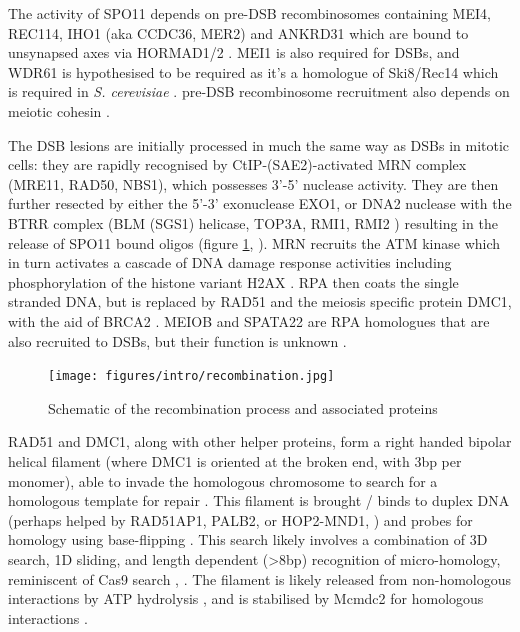 The activity of SPO11 depends on pre-DSB recombinosomes containing MEI4, REC114, IHO1 (aka CCDC36, MER2) and ANKRD31 which are bound to unsynapsed axes via HORMAD1/2 \parencite{Kumar2010Functional,Panizza2011Spo11Accessory, Stanzione2016Meiotic, Kumar2018Mouse, Papanikos2019Mouse, Boekhout2019REC114}. MEI1 is also required for DSBs, and WDR61 is hypothesised to be required as it's a homologue of Ski8/Rec14 which is required in \textit{S. cerevisiae} \parencite[reviewed in][]{Kumar2010Initiation, Lam2015Mechanism}. pre-DSB recombinosome recruitment also depends on meiotic cohesin \parencite{Bhattacharyya2019Prdm9}.

The DSB lesions are initially processed in much the same way as DSBs in mitotic cells: they are rapidly recognised by CtIP-(SAE2)-activated MRN complex (MRE11, RAD50, NBS1), which possesses 3'-5' nuclease activity. They are then further resected by either the 5'-3' exonuclease EXO1, or DNA2 nuclease with the BTRR complex (BLM (SGS1) helicase, TOP3A, RMI1, RMI2 \parencite{Daley2014Multifaceted}) resulting in the release of SPO11 bound oligos (figure \ref{fig:molecular_recombination}, \cite[Reviewed in][]{Symington2014End, Schiller2014Structural, Lam2015Mechanism}). MRN recruits the ATM kinase which in turn activates a cascade of DNA damage response activities including phosphorylation of the histone variant H2AX \parencite{Marechal2013DNA}. RPA then coats the single stranded DNA, but is replaced by RAD51 and the meiosis specific protein DMC1, with the aid of BRCA2 \parencite{Liu2010Human, Jensen2010Purified, Shi2019Dual}. MEIOB and SPATA22 are RPA homologues that are also recruited to DSBs, but their function is unknown \parencite{Xu2017Meiosisspecific}.


\begin{figure}[H]
	\centering
	\texttt{[image: figures/intro/recombination.jpg]}
	\caption[Molecular Recombination]{Schematic of the recombination process and associated proteins}
	\label{fig:molecular_recombination}
\end{figure}

RAD51 and DMC1, along with other helper proteins, form a right handed bipolar helical filament (where DMC1 is oriented at the broken end, with 3bp per monomer), able to invade the homologous chromosome to search for a homologous template for repair \parencite{Sehorn2004Human, Cloud2012Rad51, Brown2015Small, Brown2015DNA, Crickard2018Spontaneous}. This filament is brought / binds to duplex DNA (perhaps helped by RAD51AP1, PALB2, or HOP2-MND1, \cite{Petukhova2005Hop2}) and probes for homology using base-flipping \parencite{Gupta1999Rapid, Folta-Stogniew2004Exchange}. This search likely involves a combination of 3D search, 1D sliding, and length dependent (>8bp) recognition of micro-homology, reminiscent of Cas9 search \parencite{Ragunathan2012RecA,Forget2012Singlemolecule,Renkawitz2013Monitoring,Qi2015DNA,Lee2015Base}, \parencite[reviewed in][]{Barzel2008Finding, Renkawitz2014Mechanisms, Greene2016DNA, Kaniecki2018change, Haber2018DNA}. The filament is likely released from non-homologous interactions by ATP hydrolysis \parencite{Lee2016ATP}, and is stabilised by Mcmdc2 for homologous interactions \parencite{McNairn2017Repair}. 

